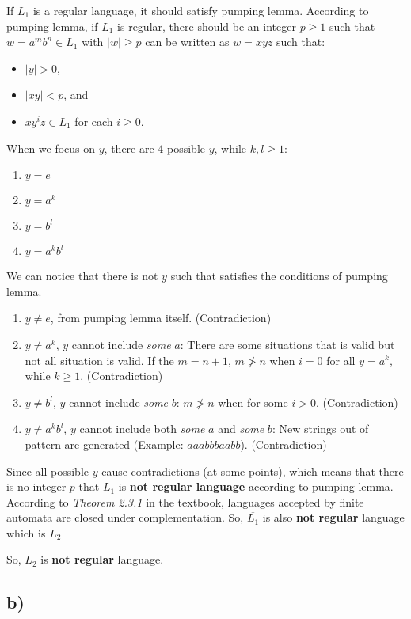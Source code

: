 \documentclass{article}
\begin{document}
\quad If $L_1$ is a regular language, it should satisfy pumping lemma. According to pumping lemma, if $L_1$ is regular, there should be an integer $p \geq 1$ such that $w = a^mb^n \in L_1$ with $|w| \geq p$ can be written as $w = xyz$ such that:
\begin{itemize}
  \item $|y| > 0$,
  \item $|xy| < p$, and
  \item $xy^iz \in L_1$ for each $i \geq 0$.
\end{itemize}

\noindent When we focus on $y$, there are 4 possible $y$, while $k, l \geq 1$:
\begin{enumerate}
  \item $y = e$
  \item $y = a^k$
  \item $y = b^l$
  \item $y = a^kb^l$
\end{enumerate}

\noindent We can notice that there is not $y$ such that satisfies the conditions of pumping lemma. 
\begin{enumerate}
  \item $y \neq e$, from pumping lemma itself. (Contradiction)
  \item $y \neq a^k$, $y$ cannot include \textit{some} $a$: There are some situations that is valid but not all situation is valid. If the $m = n + 1$, $m \ngtr n$ when $i = 0$ for all $y = a^k$, while $k \geq 1$. (Contradiction)
  \item $y \neq b^l$, $y$ cannot include \textit{some} $b$: $m \ngtr n$ when for some $i > 0$. (Contradiction)
  \item $y \neq a^kb^l$, $y$ cannot include both \textit{some} $a$ and \textit{some} $b$: New strings out of pattern are generated (Example: $aaabbbaabb$). (Contradiction)
\end{enumerate}

\noindent Since all possible $y$ cause contradictions (at some points), which means that there is no integer $p$ that $L_1$ is \textbf{not regular language} according to pumping lemma. According to \textit{Theorem 2.3.1} in the textbook, languages accepted by finite automata are closed under complementation. So, $\overline{L_1}$ is also \textbf{not regular} language which is $L_2$

So, $L_2$ is \textbf{not regular} language.

\subsection*{b)}
\end{document}
